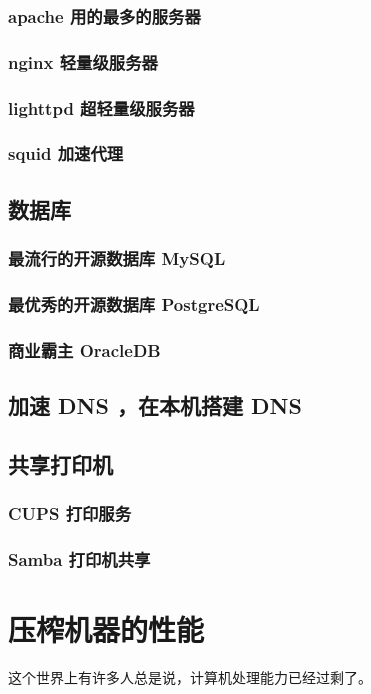 \documentclass[amstex,twoside]{ctexbook}
\begin{document}
\subsection{  apache 用的最多的服务器}
\subsection{ nginx 轻量级服务器}
\subsection{ lighttpd 超轻量级服务器}
\subsection{ squid 加速代理	}
\section{  数据库	}
\subsection{  最流行的开源数据库 MySQL}
\subsection{  最优秀的开源数据库 PostgreSQL 	}
\subsection{  商业霸主 OracleDB	}
\section{  加速 DNS ，在本机搭建 DNS	}
\section{  共享打印机	}
\subsection{ CUPS 打印服务	}
\subsection{ Samba 打印机共享	}


\chapter{压榨机器的性能}

这个世界上有许多人总是说，计算机处理能力已经过剩了。
\end{document}
